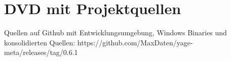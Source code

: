 \chapter[DVD mit Projektquellen]{DVD mit Projektquellen}\label{chap:dvd}

Quellen auf Github mit Entwicklungsumgebung, Windows Binaries und konsolidierten Quellen:
https://github.com/MaxDaten/yage-meta/releases/tag/0.6.1
